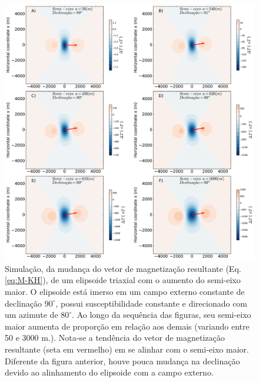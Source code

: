 \begin{figure}[hbt!]
	\centering \includegraphics[width=16 cm,height=16 cm]{figures/ellipsoid_shape_iso2}
	\caption[Simulação, da mudança do vetor de magnetização resultante (Eq. \ref{eq:M-KH}), de um elipsoide triaxial com o aumento do semi-eixo maior. O elipsoide está imerso em um campo externo constante de declinação $90^{\circ}$, possui susceptibilidade constante e direcionado com um azimute de $80^{\circ}$. Ao longo da sequência das figuras, seu semi-eixo maior aumenta de proporção em relação aos demais (variando entre 50 e 3000 m.). Nota-se a tendência do vetor de magnetização resultante (seta em vermelho) em se alinhar com o semi-eixo maior. Diferente da figura anterior, houve pouca mudança na declinação devido ao alinhamento do elipsoide com a campo externo.]
	{Simulação, da mudança do vetor de magnetização resultante (Eq. \ref{eq:M-KH}), de um elipsoide triaxial com o aumento do semi-eixo maior. O elipsoide está imerso em um campo externo constante de declinação $90^{\circ}$, possui susceptibilidade constante e direcionado com um azimute de $80^{\circ}$. Ao longo da sequência das figuras, seu semi-eixo maior aumenta de proporção em relação aos demais (variando entre 50 e 3000 m.). Nota-se a tendência do vetor de magnetização resultante (seta em vermelho) em se alinhar com o semi-eixo maior. Diferente da figura anterior, houve pouca mudança na declinação devido ao alinhamento do elipsoide com a campo externo.}
	\label{fig:ellipsoid_shape_iso80}
\end{figure}